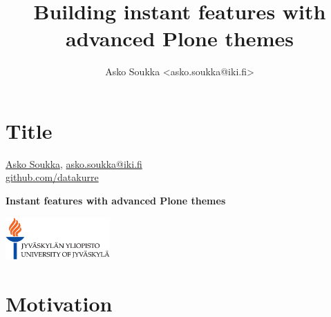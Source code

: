 \documentclass[aspectratio=43]{beamer}
\title{Building instant features with advanced Plone themes}
\author{Asko Soukka <asko.soukka@iki.fi>}
\begin{document}
\section{Title}

\begin{frame}[plain,t]
  \vspace{2em}
  \centering
  \href{http://iki.fi/asko.soukka/}{Asko Soukka},
  \href{mailto:asko.soukka@iki.fi}{asko.soukka@iki.fi}\\
  \href{https://github.com/datakure/}{github.com/datakurre}
  \par
  \vspace{3em}
  \Huge
  \bfseries
  Instant features with advanced Plone themes
  \par
  \vspace{2em}
  \href{https://www.jyu.fi/}{\includegraphics[width=4cm]{images/logo.eps}}
\end{frame}

\section{Motivation}
\end{document}

